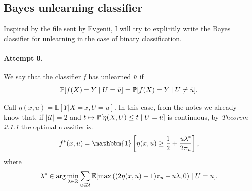 {\color{RoyalBlue}
\subsection{Bayes unlearning classifier}
Inspired by the file sent by Evgenii, I will try to explicitly write the Bayes classifier for unlearning in the case of binary classification.
\paragraph{Attempt 0.} We say that the classifier $f$ has unlearned $\bar{u}$ if $$\P[f(X)=Y \mid U=\bar{u}]=\P[f(X)=Y \mid U\neq \bar{u}]. $$ 

    Call $\eta(x,u) = \mathbb{E}[Y|X=x,U=u]$.
    In this case, from the notes we already know that, if $|\mathcal{U}|=2$ and $t\mapsto\P[\eta(X,U)\leq t \mid U=u]$ is continuous, by \emph{Theorem 2.1.1} the optimal classifier is:
    \begin{equation}
        f^*(x,u)=\mathbbm{1}\left[\eta(x,u) \ge \frac{1}{2}+\frac{u\lambda^*}{2\pi_u}\right] ,
    \end{equation} 
    where
    $$ \lambda^* \in \arg\min_{\lambda\in\R} \sum_{u\in\mathcal{U}}\mathbb{E}[\max\left((2\eta(x,u)-1)\pi_u-u\lambda,0\right) \mid U=u] .$$

}
